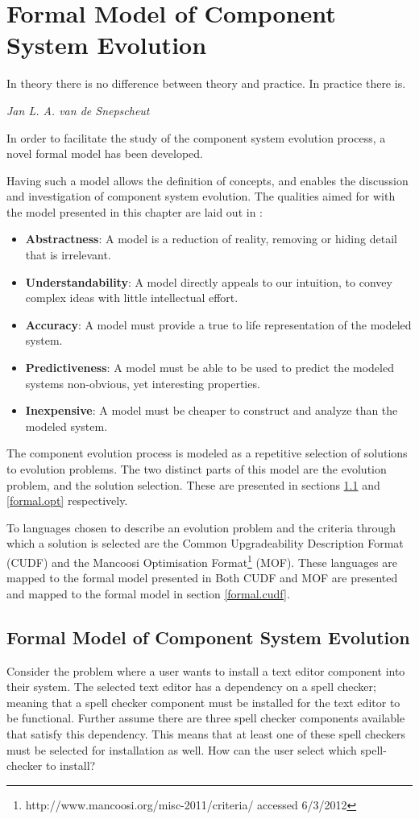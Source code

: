 \chapter{Formal Model of Component System Evolution}
\label{formal}
\epigraph{In theory there is no difference between theory and practice. In practice there is.}
{\textit{Jan L. A. van de Snepscheut}}
In order to facilitate the study of the component system evolution process, a novel formal model has been developed.

Having such a model allows the definition of concepts, and enables the discussion and investigation of component system evolution.
The qualities aimed for with the model presented in this chapter are laid out in \citep{Selic2003}:
\begin{itemize}
  \item \textbf{Abstractness}: A model is a reduction of reality, removing or hiding detail that is irrelevant.
  \item \textbf{Understandability}: A model directly appeals to our intuition, to convey complex ideas with little intellectual effort.
  \item \textbf{Accuracy}: A model must provide a true to life representation of the modeled system.
  \item \textbf{Predictiveness}: A model must be able to be used to predict the modeled systems non-obvious, yet interesting properties.
  \item \textbf{Inexpensive}: A model must be cheaper to construct and analyze than the modeled system.
\end{itemize}

The component evolution process is modeled as a repetitive selection of solutions to evolution problems.
The two distinct parts of this model are the evolution problem, and the solution selection.
These are presented in sections \ref{formal.step} and \ref{formal.opt} respectively.

To languages chosen to describe an evolution problem and the criteria through which a solution is selected
are the Common Upgradeability Description Format (CUDF) \citep{treinen2009common}
and the Mancoosi Optimisation Format\footnote{http://www.mancoosi.org/misc-2011/criteria/ accessed 6/3/2012} (MOF).
These languages are mapped to the formal model presented in 
Both CUDF and MOF are presented and mapped to the formal model in section \ref{formal.cudf}. 

\section{Formal Model of Component System Evolution}
\label{formal.step}
Consider the problem where a user wants to install a text editor component into their system.
The selected text editor has a dependency on a spell checker;
meaning that a spell checker component must be installed for the text editor to be functional.
Further assume there are three spell checker components available that satisfy this dependency.
This means that at least one of these spell checkers must be selected for installation as well.
How can the user select which spell-checker to install? 

